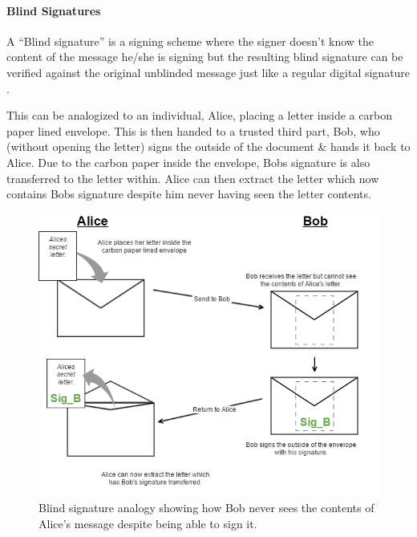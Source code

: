 \documentclass{article}
\begin{document}
\begin{adjustwidth}{0.5cm}{}
	\paragraph{Blind Signatures}
	\hfill \break \break

	A ``Blind signature'' is a signing scheme where the signer doesn't know the content of the message he/she is signing but the resulting blind signature can be verified against the original unblinded message just like a regular digital signature \citep{64_ryan_2017}.

	This can be analogized to an individual, Alice, placing a letter inside a carbon paper lined envelope. This is then handed to a trusted third part, Bob, who (without opening the letter) signs the outside of the document \& hands it back to Alice. Due to the carbon paper inside the envelope, Bobs signature is also transferred to the letter within. Alice can then extract the letter which now contains Bobs signature despite him never having seen the letter contents.

	\begin{figure}[h]
	\begin{adjustwidth}{0.5cm}{}
	  	\includegraphics[width=\textwidth]{Blind_Signatures}
		\caption{Blind signature analogy showing how Bob never sees the contents of Alice's message despite being able to sign it.}
	\end{adjustwidth}
	\end{figure}



\end{adjustwidth}
\end{document}
